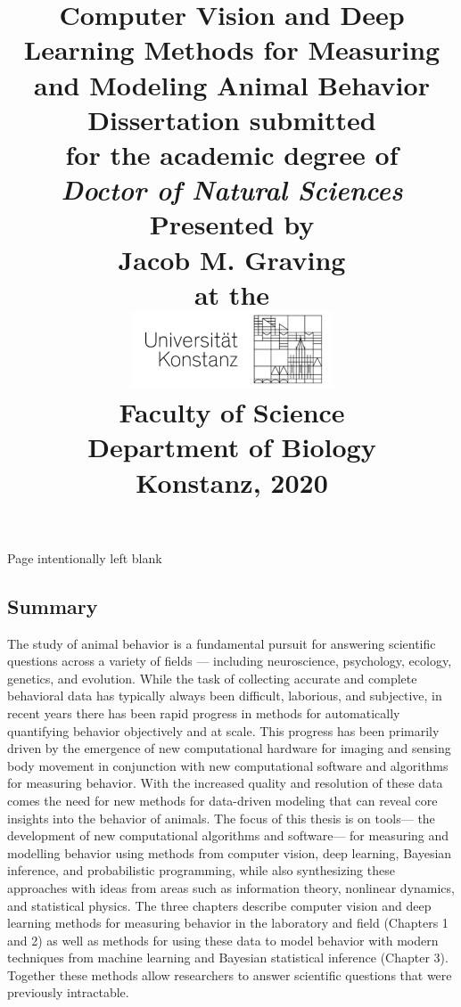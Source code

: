 \documentclass[11pt,a4paper,twoside]{book}
\title{
	\HUGE \textbf{Computer Vision and Deep Learning Methods for Measuring and Modeling Animal Behavior} \\
	\vspace{4cm}
	\Large Dissertation submitted \\
	\Large for the academic degree of \\
	\vspace{0.5cm}
	\Large \textit{Doctor of Natural Sciences} \\

	\vspace{2cm}
    \Large Presented by \\
    \vspace{0.5cm}
    \LARGE Jacob M. Graving \\
    \vspace{0.5cm}
    \Large at the \\
    \vspace{0.1cm}
	\includegraphics[width=6cm]{Graving_IMPRS_Thesis/graphics/uni_logo.png}\\
	\vspace{2cm}
	\Large Faculty of Science \\
	\Large Department of Biology \\
	\vspace{2cm}
	\Large Konstanz, 2020
	\date{}
}
\begin{document}
	\maketitle
    \newpage
    Page intentionally left blank
    \newpage
	\tableofcontents
	\setcounter{page}{1}
\begin{doublespace}
	\chapter*{Summary}
  The study of animal behavior is a fundamental pursuit for answering scientific questions across a variety of fields --- including neuroscience, psychology, ecology, genetics, and evolution. While the task of collecting accurate and complete behavioral data has typically always been difficult, laborious, and subjective, in recent years there has been rapid progress in methods for automatically quantifying behavior objectively and at scale. This progress has been primarily driven by the emergence of new computational hardware for imaging and sensing body movement in conjunction with new computational software and algorithms for measuring behavior. With the increased quality and resolution of these data comes the need for new methods for data-driven modeling that can reveal core insights into the behavior of animals. The focus of this thesis is on tools— the development of new computational algorithms and software— for measuring and modelling behavior using methods from computer vision, deep learning, Bayesian inference, and probabilistic programming, while also synthesizing these approaches with ideas from areas such as information theory, nonlinear dynamics, and statistical physics. The three chapters describe computer vision and deep learning methods for measuring behavior in the laboratory and field (Chapters 1 and 2) as well as methods for using these data to model behavior with modern techniques from machine learning and Bayesian statistical inference (Chapter 3). Together these methods allow researchers to answer scientific questions that were previously intractable.


\end{doublespace}
\end{document}
